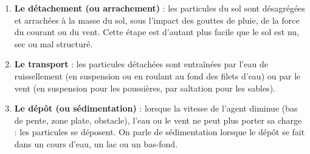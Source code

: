 \documentclass[11pt]{article}
\newcommand{\cle}[1]{{\popxbold\color{popdark}#1}}
\begin{document}
\begin{enumerate}
\item \textbf{Le détachement (ou arrachement)} : les particules du sol sont désagrégées et arrachées à la masse du sol, sous l'impact des gouttes de pluie, de la force du courant ou du vent. Cette étape est d'autant plus facile que le sol est nu, sec ou mal structuré.
\item \textbf{Le transport} : les particules détachées sont entraînées par l'eau de ruissellement (en suspension ou en roulant au fond des filets d'eau) ou par le vent (en suspension pour les poussières, par saltation pour les sables).
\item \textbf{Le dépôt (ou sédimentation)} : lorsque la vitesse de l'agent diminue (bas de pente, zone plate, obstacle), l'eau ou le vent ne peut plus porter sa charge : les particules se déposent. On parle de \cle{sédimentation} lorsque le dépôt se fait dans un cours d'eau, un lac ou un bas-fond.
\end{enumerate}
\end{document}
